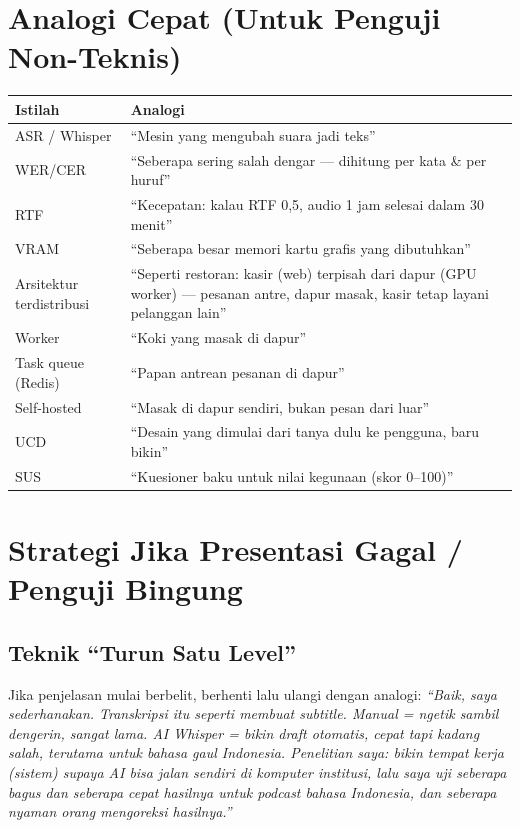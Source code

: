 \documentclass[11pt,a4paper]{article}
\begin{document}
\section{Analogi Cepat (Untuk Penguji Non-Teknis)}

\begin{center}
\renewcommand{\arraystretch}{1.3}
\begin{tabular}{|p{4.5cm}|p{8.5cm}|}
\hline
\rowcolor{lightgray} \textbf{Istilah} & \textbf{Analogi} \\
\hline
ASR / Whisper & ``Mesin yang mengubah suara jadi teks'' \\
\hline
WER/CER & ``Seberapa sering salah dengar --- dihitung per kata \& per huruf'' \\
\hline
RTF & ``Kecepatan: kalau RTF 0,5, audio 1 jam selesai dalam 30 menit'' \\
\hline
VRAM & ``Seberapa besar memori kartu grafis yang dibutuhkan'' \\
\hline
Arsitektur terdistribusi & ``Seperti restoran: kasir (web) terpisah dari dapur (GPU worker) --- pesanan antre, dapur masak, kasir tetap layani pelanggan lain'' \\
\hline
Worker & ``Koki yang masak di dapur'' \\
\hline
Task queue (Redis) & ``Papan antrean pesanan di dapur'' \\
\hline
Self-hosted & ``Masak di dapur sendiri, bukan pesan dari luar'' \\
\hline
UCD & ``Desain yang dimulai dari tanya dulu ke pengguna, baru bikin'' \\
\hline
SUS & ``Kuesioner baku untuk nilai kegunaan (skor 0--100)'' \\
\hline
\end{tabular}
\end{center}

\section{Strategi Jika Presentasi Gagal / Penguji Bingung}

\subsection{Teknik ``Turun Satu Level''}
Jika penjelasan mulai berbelit, berhenti lalu ulangi dengan analogi:
\emph{``Baik, saya sederhanakan. Transkripsi itu seperti membuat subtitle. Manual = ngetik sambil dengerin, sangat lama. AI Whisper = bikin draft otomatis, cepat tapi kadang salah, terutama untuk bahasa gaul Indonesia. Penelitian saya: bikin tempat kerja (sistem) supaya AI bisa jalan sendiri di komputer institusi, lalu saya uji seberapa bagus dan seberapa cepat hasilnya untuk podcast bahasa Indonesia, dan seberapa nyaman orang mengoreksi hasilnya.''}
\end{document}

